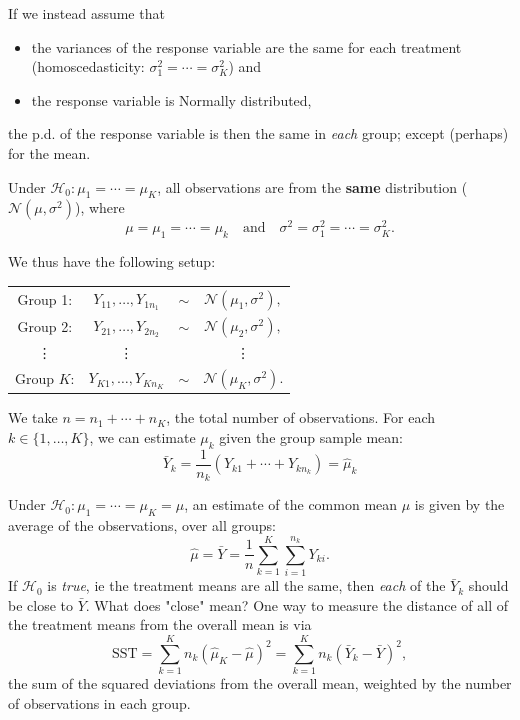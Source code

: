 \documentclass[12pt]{article}
\begin{document}
If we instead assume that \begin{itemize}
    \item the variances of the response variable are the same for each treatment (homoscedasticity: $\sigma_1^2 = \cdots = \sigma_K^2$) and
    \item the response variable is Normally distributed,
\end{itemize}

the p.d. of the response variable is then the same in \textit{each} group; except (perhaps) for the mean.

Under $\mathcal{H}_0: \mu_1 = \cdots = \mu_K$, all observations are from the \textbf{same} distribution ($\mathcal{N}(\mu, \sigma^2)$), where \[\mu = \mu_1 = \cdots =\mu_k \quad \text{and} \quad \sigma^2 = \sigma_1^2 = \cdots = \sigma_K^2.\]

We thus have the following setup:
\begin{center}
\begin{tabular}{c c c c}
    Group 1: & $Y_{11}, \dots, Y_{1n_1}$ & $\sim$ & $\mathcal{N}(\mu_1, \sigma^2),$\\
    Group 2: & $Y_{21}, \dots, Y_{2n_2}$ & $\sim$ & $\mathcal{N}(\mu_2, \sigma^2),$\\
    \vdots & \vdots &  & \vdots\\
    Group $K$: & $Y_{K1}, \dots, Y_{Kn_K}$ & $\sim$ & $\mathcal{N}(\mu_K, \sigma^2).$
\end{tabular}
\end{center}

We take $n = n_1 + \cdots + n_K$, the total number of observations. For each $k \in \{1, \dots, K\}$, we can estimate $\mu_k$ given the group sample mean:
\[\bar{Y}_k = \frac{1}{n_k}(Y_{k1} + \cdots + Y_{kn_k}) = \hat{\mu}_k\]

Under $\mathcal{H}_0: \mu_1 = \cdots = \mu_K = \mu$, an estimate of the common mean $\mu$ is given by the average of the observations, over all groups:
\[\hat{\mu} = \bar{Y} = \frac{1}{n}\sum_{k=1}^K\sum_{i=1}^{n_k}Y_{ki}.\] If $\mathcal{H}_0$ is \textit{true}, ie the treatment means are all the same, then \textit{each} of the $\bar{Y}_k$ should be close to $\bar{Y}$. What does "close" mean? One way to measure the distance of all of the treatment means from the overall mean is via \[\text{SST} = \sum_{k=1}^K n_k(\hat{\mu}_K-\hat{\mu})^2 = \sum_{k=1}^K n_k(\bar{Y}_k - \bar{Y})^2,\] the sum of the squared deviations from the overall mean, weighted by the number of observations in each group.
\end{document}
